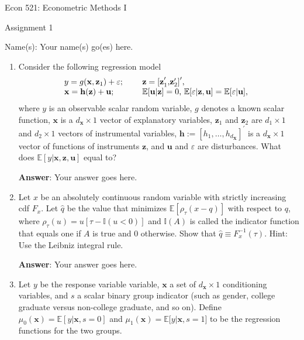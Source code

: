 \documentclass[12pt,letter]{article}%
\begin{document}
\begin{center}
Econ 521: Econometric Methods I

Assignment 1
\end{center}

\noindent Name(s): Your name(s) go(es) here.\smallskip

\setlength\parindent{0pt}

\begin{enumerate}
\item Consider the following regression model%
\[%
\begin{tabular}
[c]{lll}%
$y=g(\mathbf{x},\mathbf{z}_{1})+\varepsilon$; &  & $\mathbf{z=[z}_{1}^{\prime
}$,$\mathbf{z}_{2}^{\prime}\mathbf{]}^{\prime}$,\\
$\mathbf{x}=\mathbf{h}(\mathbf{z})+\mathbf{u}$; &  & $\mathbb{E}%
[\mathbf{u}|\mathbf{z}]=0$, $\mathbb{E}[\varepsilon|\mathbf{z},\mathbf{u}%
]=\mathbb{E}[\varepsilon|\mathbf{u}]$,
\end{tabular}
\ \
\]
where $y$ is an observable scalar random variable, $g$ denotes a known scalar
function, $\mathbf{x}$ is a $d_{\mathbf{x}}\times1$ vector of explanatory
variables, $\mathbf{z}_{1}$ and $\mathbf{z}_{2}$ are $d_{1}\times1$ and
$d_{2}\times1$ vectors of instrumental variables, $\mathbf{h}:=[h_{1}%
,\ldots,h_{d_{\mathbf{X}}}]^{\prime}$ is a $d_{\mathbf{x}}\times1$ vector of
functions of instruments $\mathbf{z}$, and $\mathbf{u}$ and $\varepsilon$ are
disturbances. What does $\mathbb{E}[y|\mathbf{x},\mathbf{z},\mathbf{u}]$ equal to?

\noindent\textbf{Answer}: Your answer goes here.

\item Let $x$ be an absolutely continuous random variable with strictly
increasing cdf $F_{x}$. Let $\widehat{q}$ be the value that minimizes
$\mathbb{E}[\rho_{\tau}(x-q)]$ with respect to $q$, where $\rho_{\tau
}(u)=u[\tau-\mathbb{I}(u<0)]$ and $\mathbb{I}(A)$ is called the indicator
function that equals one if $A$ is true and $0$ otherwise. Show that
$\widehat{q}\equiv F_{x}^{-1}(\tau)$. Hint: Use the Leibniz integral rule.

\noindent\textbf{Answer}: Your answer goes here.

\item Let $y$ be the response variable variable, $\mathbf{x}$ a set of
$d_{\mathbf{x}}\times1$ conditioning variables, and $s$ a scalar binary group
indicator (such as gender, college graduate versus non-college graduate, and
so on). Define $\mu_{0}(\mathbf{x})=\mathbb{E}[y|\mathbf{x},s=0]$ and $\mu
_{1}(\mathbf{x})=\mathbb{E[}y|\mathbf{x},s=1\mathbb{]}$ to be the regression
functions for the two groups.


\end{enumerate}
\end{document}
